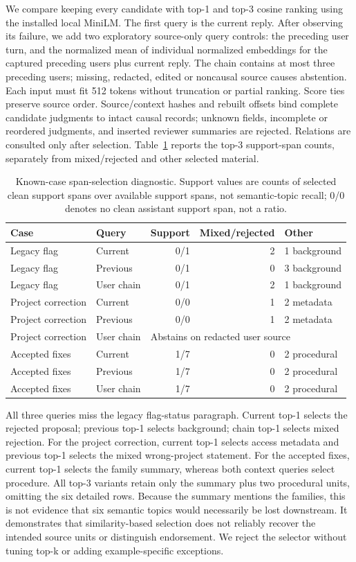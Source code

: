 \documentclass[11pt]{article}
\begin{document}
We compare keeping every candidate with top-1 and top-3 cosine ranking using
the installed local MiniLM. The first query is the current reply. After observing
its failure, we add two exploratory source-only query controls: the preceding
user turn, and the normalized mean of individual normalized embeddings for the
captured preceding users plus current reply. The chain contains at most three
preceding users; missing, redacted, edited or noncausal source causes abstention.
Each input must fit 512 tokens without truncation or partial ranking. Score ties
preserve source order. Source/context hashes and rebuilt offsets bind complete
candidate judgments to intact causal records; unknown fields, incomplete or
reordered judgments, and inserted reviewer summaries are rejected. Relations are
consulted only after selection. Table~\ref{tab:span-selection} reports the top-3
support-span counts, separately from mixed/rejected and other selected material.

\begin{table}[ht]
\centering
\small
\begin{tabular}{llrrl}
\toprule
Case & Query & Support & Mixed/rejected & Other \\
\midrule
Legacy flag & Current &0/1&2&1 background\\
Legacy flag & Previous &0/1&0&3 background\\
Legacy flag & User chain &0/1&2&1 background\\
Project correction & Current &0/0&1&2 metadata\\
Project correction & Previous &0/0&1&2 metadata\\
Project correction & User chain &\multicolumn{3}{l}{Abstains on redacted user source}\\
Accepted fixes & Current &1/7&0&2 procedural\\
Accepted fixes & Previous &1/7&0&2 procedural\\
Accepted fixes & User chain &1/7&0&2 procedural\\
\bottomrule
\end{tabular}
\caption{Known-case span-selection diagnostic. Support values are counts of
selected clean support spans over available support spans, not semantic-topic
recall; 0/0 denotes no clean assistant support span, not a ratio.}
\label{tab:span-selection}
\end{table}

All three queries miss the legacy flag-status paragraph. Current top-1 selects
the rejected proposal; previous top-1 selects background; chain top-1 selects
mixed rejection. For the project correction, current top-1 selects access
metadata and previous top-1 selects the mixed wrong-project statement. For the
accepted fixes, current top-1 selects the family summary, whereas both context
queries select procedure. All top-3 variants retain only the summary plus two
procedural units, omitting the six detailed rows. Because the summary mentions
the families, this is not evidence that six semantic topics would necessarily
be lost downstream. It demonstrates that similarity-based selection does not
reliably recover the intended source units or distinguish endorsement. We reject
the selector without tuning top-k or adding example-specific exceptions.
\end{document}
